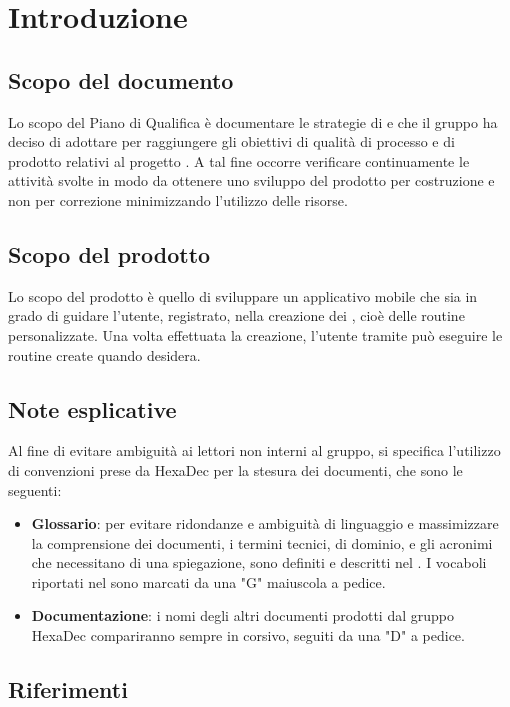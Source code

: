 \justify
\section{Introduzione}
    \subsection{Scopo del documento}
        Lo scopo del Piano di Qualifica è documentare le strategie di  e  che il gruppo \groupName{} ha deciso
        di adottare per raggiungere gli obiettivi di qualità di processo e di prodotto relativi al progetto \projectName{}.
        A tal fine occorre verificare continuamente le attività svolte in modo da ottenere uno sviluppo del prodotto per costruzione e non per correzione minimizzando l'utilizzo delle risorse.  

    \subsection{Scopo del prodotto}
        Lo scopo del prodotto è quello di sviluppare un applicativo mobile che sia in grado di guidare l'utente, registrato, nella 
        creazione dei , cioè delle routine personalizzate. Una volta effettuata la creazione, l'utente tramite  può 
        eseguire le routine create quando desidera.
    \subsection{Note esplicative}
        Al fine di evitare ambiguità ai lettori non interni al gruppo, si specifica l'utilizzo di convenzioni prese da HexaDec per la stesura dei documenti, che sono le seguenti: 
       \begin{itemize}
        \item \textbf{Glossario}: per evitare ridondanze e ambiguità di linguaggio e massimizzare la comprensione dei documenti, i termini tecnici, di dominio, e gli acronimi  che necessitano di una spiegazione, sono  definiti e descritti nel \docNameVersionGlo. I vocaboli riportati nel \docNameVersionGlo{} sono marcati da una "G" maiuscola a pedice.
        \item \textbf{Documentazione}: i nomi degli altri documenti prodotti dal gruppo HexaDec compariranno sempre in corsivo, seguiti da una "D" a pedice.
        \end{itemize}

    \subsection{Riferimenti}
